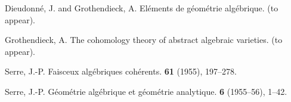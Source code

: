 \documentclass{article}
\theoremstyle{plain}
\begin{document}
\nocite{*}
\begin{thebibliography}{4}

  {\sc Dieudonn\'{e}, J. and Grothendieck, A.}
  \newblock El\'{e}ments de g\'{e}om\'{e}trie alg\'{e}brique.
   (to appear).

  {\sc Grothendieck, A.}
  \newblock The cohomology theory of abstract algebraic varieties.
   (to appear).

  {\sc Serre, J.-P.}
  \newblock Faisceux alg\'{e}briques coh\'{e}rents.
   {\bf 61} (1955), 197--278.

  {\sc Serre, J.-P.}
  \newblock G\'{e}om\'{e}trie alg\'{e}brique et g\'{e}om\'{e}trie analytique.
   \textbf{6} (1955--56), 1--42.

\end{thebibliography}
\end{document}
